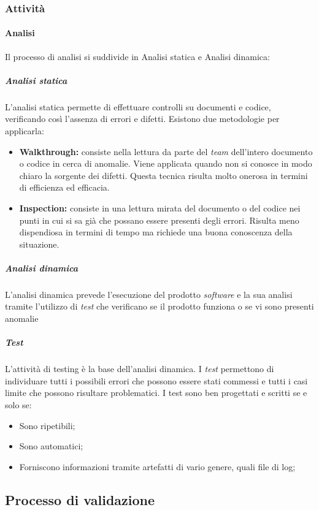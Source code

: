 			\subsubsection{Attività}
				\paragraph{Analisi}
					Il processo di analisi si suddivide in Analisi statica e Analisi dinamica:
						\subparagraph{Analisi statica}
							L'analisi statica permette di effettuare controlli su documenti e codice, verificando così l'assenza di errori e difetti. Esistono due metodologie per applicarla:
								\begin{itemize}
									\item \textbf{Walkthrough:} consiste nella lettura da parte del \emph{team} dell'intero documento o codice in cerca di anomalie. Viene applicata quando non si conosce in modo chiaro la sorgente dei difetti. Questa tecnica risulta molto onerosa in termini di efficienza ed efficacia.
									\item \textbf{Inspection:} consiste in una lettura mirata del documento o del codice nei punti in cui si sa già che possano essere presenti degli errori. Risulta meno dispendiosa in termini di tempo ma richiede una buona conoscenza della situazione.
								\end{itemize}
						\subparagraph{Analisi dinamica}
							L'analisi dinamica prevede l'esecuzione del prodotto \emph{software} e la sua analisi tramite l'utilizzo di \emph{test} che verificano se il prodotto funziona o se vi sono presenti anomalie
						\subparagraph{Test}
							L'attività di testing è la base dell'analisi dinamica. I \emph{test} permettono di individuare tutti i possibili errori che possono essere stati commessi e tutti i casi limite che possono risultare problematici. \newline
							I test sono ben progettati e scritti se e solo se:
								\begin{itemize}
									\item Sono ripetibili;
									\item Sono automatici;
									\item Forniscono informazioni tramite artefatti di vario genere, quali file di log;
								\end{itemize}
		
		\subsection{Processo di validazione} %
